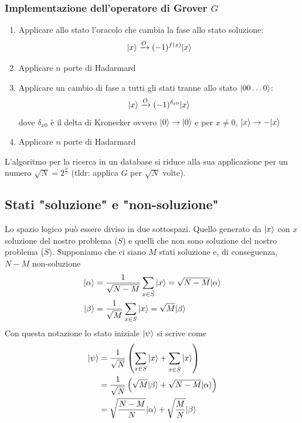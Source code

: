 \documentclass[12pt, a4paper]{report}
\begin{document}
\subsubsection{Implementazione dell'operatore di Grover $G$}
\begin{enumerate}
    \item Applicare allo stato l'oracolo che cambia la fase allo stato soluzione: \begin{equation*}
        | x \rangle\xrightarrow{O}(-1)^{f(x)}| x \rangle
    \end{equation*}
    \item Applicare $n$ porte di Hadarmard
    \item Applicare un cambio di fase a tutti gli stati tranne allo stato $| 00\ldots 0 \rangle$: \begin{equation*}
        | x \rangle\xrightarrow{O}(-1)^{\delta_{x0}}| x \rangle
    \end{equation*} dove $\delta_{x0}$ è il delta di Kronecker ovvero $| 0 \rangle\rightarrow| 0 \rangle$ e per $x\neq 0$, $| x \rangle\rightarrow -| x \rangle$
    \item Applicare $n$ porte di Hadarmard
\end{enumerate}
L'algoritmo per la ricerca in un database si riduce alla sua applicazione per un numero $\sqrt{N}=2^{\frac{n}{2}}$ (tldr: applica $G$ per $\sqrt{N}$ volte).
\subsection{Stati "soluzione" e "non-soluzione"}
Lo spazio logico può essere diviso in due sottospazi. Quello generato da $| x \rangle$ con $x$ soluzione del nostro problema ($S$) e quelli che non sono soluzione del nostro problema ($\bar{S}$). Supponiamo che ci siano $M$ stati soluzione e, di conseguenza, $N-M$ non-soluzione
\begin{equation*}
    \begin{split}
        | \alpha \rangle &= \frac{1}{\sqrt{N-M}}\sum_{x\in\bar{S}}| x \rangle = \sqrt{N-M}| \alpha \rangle \\
        | \beta \rangle &= \frac{1}{\sqrt{M}}\sum_{x\in S}| x \rangle = \sqrt{M}| \beta \rangle
    \end{split}
\end{equation*}
Con questa notazione lo stato iniziale $| \psi \rangle$ si scrive come
\begin{equation*}
    \begin{split}
        | \psi \rangle &= \frac{1}{\sqrt{N}}\left(\sum_{x\in S}| x \rangle+\sum_{x\in\bar{S}}| x \rangle\right) \\
        &= \frac{1}{\sqrt{N}}\left(\sqrt{M}| \beta \rangle+\sqrt{N-M}| \alpha \rangle\right) \\
        &= \sqrt{\frac{N-M}{N}}| \alpha \rangle+\sqrt{\frac{M}{N}}| \beta \rangle
    \end{split}
\end{equation*}
\end{document}
